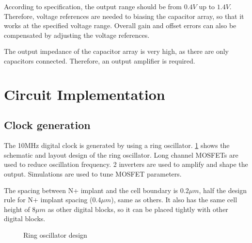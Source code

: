 \documentclass[journal]{IEEEtran}
\newcommand{\fref}[1]{\figurename \ref{#1}}
\begin{document}
According to specification, the output range should be from $0.4 V$ up to $1.4 V$. Therefore, voltage references are needed to biasing the capacitor array, so that it works at the specified voltage range. Overall gain and offset errors can also be compensated by adjusting the voltage references.

The output impedance of the capacitor array is very high, as there are only capacitors connected. Therefore, an output amplifier is required.

\section{Circuit Implementation}

\subsection{Clock generation}

The 10MHz digital clock is generated by using a ring oscillator. \fref{fig_ringosc} shows the schematic and layout design of the ring oscillator. Long channel MOSFETs are used to reduce oscillation frequency. 2 inverters are used to amplify and shape the output. Simulations are used to tune MOSFET parameters.

The spacing between N+ implant and the cell boundary is $0.2 \mu m$, half the design rule for N+ implant spacing ($0.4 \mu m$), same as others. It also has the same cell height of $8 \mu m$ as other digital blocks, so it can be placed tightly with other digital blocks.

\begin{figure}[!t]
	\centering
	\hfil
	\caption{Ring oscillator design}
	\label{fig_ringosc}
\end{figure}
\end{document}
